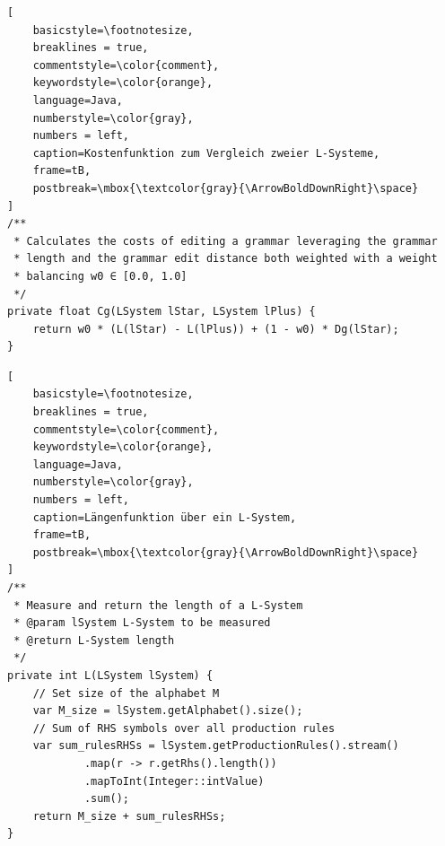 \begin{lstlisting}[
    basicstyle=\footnotesize,
    breaklines = true,
    commentstyle=\color{comment},
    keywordstyle=\color{orange},
    language=Java,
    numberstyle=\color{gray},
    numbers = left,
    caption=Kostenfunktion zum Vergleich zweier L-Systeme,
    frame=tB,
    postbreak=\mbox{\textcolor{gray}{\ArrowBoldDownRight}\space}
]
/**
 * Calculates the costs of editing a grammar leveraging the grammar
 * length and the grammar edit distance both weighted with a weight
 * balancing w0 ∈ [0.0, 1.0]
 */
private float Cg(LSystem lStar, LSystem lPlus) {
    return w0 * (L(lStar) - L(lPlus)) + (1 - w0) * Dg(lStar);
}
\end{lstlisting}
\begin{lstlisting}[
    basicstyle=\footnotesize,
    breaklines = true,
    commentstyle=\color{comment},
    keywordstyle=\color{orange},
    language=Java,
    numberstyle=\color{gray},
    numbers = left,
    caption=Längenfunktion über ein L-System,
    frame=tB,
    postbreak=\mbox{\textcolor{gray}{\ArrowBoldDownRight}\space}
]
/**
 * Measure and return the length of a L-System
 * @param lSystem L-System to be measured
 * @return L-System length
 */
private int L(LSystem lSystem) {
    // Set size of the alphabet M
    var M_size = lSystem.getAlphabet().size();
    // Sum of RHS symbols over all production rules
    var sum_rulesRHSs = lSystem.getProductionRules().stream()
            .map(r -> r.getRhs().length())
            .mapToInt(Integer::intValue)
            .sum();
    return M_size + sum_rulesRHSs;
}
\end{lstlisting}

